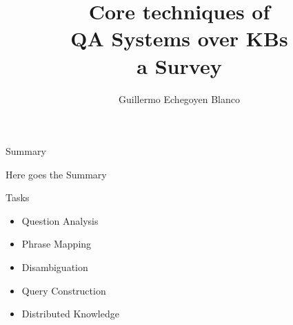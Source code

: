 \documentclass{beamer}
\title{Core techniques of \\ \textbf{QA Systems over KBs \\ a Survey}}
\author{Guillermo Echegoyen Blanco}
\date{}
\begin{document}
\maketitle


\begin{frame}{Summary}
  \begin{card}
    Here goes the Summary
  \end{card}
\end{frame}

\begin{comment}
\begin{frame}{Tasks}
  \centering
  \begin{columns}
    \setbeamercolor{coloredboxstuff}{fg=white,bg=white!10!box1}
    \begin{beamercolorbox}[wd=0.33\textwidth,sep=1em]{coloredboxstuff}
      \centering
      Question Analysis
    \end{beamercolorbox}
    \setbeamercolor{coloredboxstuff}{fg=white,bg=white!10!box2}
    \begin{beamercolorbox}[wd=0.33\textwidth,sep=1em]{coloredboxstuff}
      \centering
      Phrase Mapping
    \end{beamercolorbox}
    \setbeamercolor{coloredboxstuff}{fg=white,bg=white!10!box3}
    \begin{beamercolorbox}[wd=0.33\textwidth,sep=1em]{coloredboxstuff}
      \centering
      Disambiguation
    \end{beamercolorbox}
  \end{columns}
  \begin{columns}
    \setbeamercolor{coloredboxstuff}{fg=white,bg=white!10!box4}
    \begin{beamercolorbox}[wd=0.5\textwidth,sep=1em]{coloredboxstuff}
      \centering
      Query Construction
    \end{beamercolorbox}
    \setbeamercolor{coloredboxstuff}{fg=white,bg=white!10!box5}
    \begin{beamercolorbox}[wd=0.5\textwidth,sep=1em]{coloredboxstuff}
      \centering
      Distributed Knowledge
    \end{beamercolorbox}
  \end{columns}
\end{frame}
\end{comment}

\begin{frame}{Tasks}
  \begin{card}
    \begin{itemize}
      \item Question Analysis
      \item Phrase Mapping
      \item Disambiguation
      \item Query Construction
      \item Distributed Knowledge
    \end{itemize}
  \end{card}
\end{frame}
\end{document}
